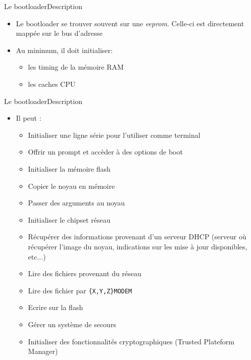 \begin{frame}[fragile=singleslide]{Le bootloader}{Description}
  \begin{itemize}
  \item    Le    bootloader     se    trouver    souvent    sur    une
    \emph{eeprom}.  Celle-ci   est  directement  mappée   sur  le  bus
    d'adresse
  \item Au minimum, il doit initialiser:
    \begin{itemize}
    \item les timing de la mémoire RAM
    \item les caches CPU
    \end{itemize}
  \end{itemize}
\end{frame}

\begin{frame}[fragile=singleslide]{Le bootloader}{Description}
  \begin{itemize}
  \item Il peut :
    \begin{itemize}
    \item Initialiser une ligne série pour l'utiliser comme terminal
    \item Offrir un prompt et accèder à des options de boot
    \item Initialiser la mémoire flash
    \item Copier le noyau en mémoire
    \item Passer des arguments au noyau
    \item Initialiser le chipset réseau
    \item  Récupérer  des  informations  provenant d'un  serveur  DHCP
      (serveur où récupérer l'image du noyau, indications sur les mise
      à jour disponibles, etc...)
    \item Lire des fichiers provenant du réseau
    \item Lire des fichier par \verb+{X,Y,Z}MODEM+
    \item Ecrire sur la flash
    \item Gérer un système de secours
    \item  Initialiser des  fonctionnalités  cryptographiques (Trusted
      Plateform Manager)
    \end{itemize}
  \end{itemize}
\end{frame}


